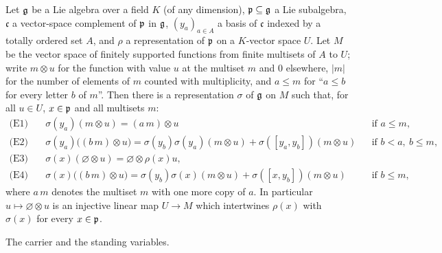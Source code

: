 \begin{theorem}\label{l02:thm:relrep}
Let $\mathfrak{g}$ be a Lie algebra over a field $K$ (of any dimension), $\mathfrak{p}\subseteq\mathfrak{g}$ a Lie subalgebra,
$\mathfrak c$ a vector-space complement of $\mathfrak{p}$ in $\mathfrak{g}$, $(y_a)_{a\in A}$ a basis of $\mathfrak c$ indexed by
a totally ordered set $A$, and $\rho$ a representation of $\mathfrak{p}$ on a $K$-vector space $U$. Let $M$ be the
vector space of finitely supported functions from finite multisets of $A$ to $U$; write $m\otimes u$ for
the function with value $u$ at the multiset $m$ and $0$ elsewhere, $|m|$ for the number of elements of
$m$ counted with multiplicity, and $a\le m$ for ``$a\le b$ for every letter $b$ of $m$''. Then there is a
representation $\sigma$ of $\mathfrak{g}$ on $M$ such that, for all $u\in U$, $x\in\mathfrak{p}$ and all multisets $m$:
\begin{align*}
 \text{(E1)}\quad& \sigma(y_a)(m\otimes u) = (a\,m)\otimes u &&\text{if } a\le m,\\
 \text{(E2)}\quad& \sigma(y_a)\bigl((b\,m)\otimes u\bigr) = \sigma(y_b)\sigma(y_a)(m\otimes u) + \sigma([y_a,y_b])(m\otimes u)
   &&\text{if } b<a,\ b\le m,\\
 \text{(E3)}\quad& \sigma(x)(\varnothing\otimes u) = \varnothing\otimes\rho(x)u,\\
 \text{(E4)}\quad& \sigma(x)\bigl((b\,m)\otimes u\bigr) = \sigma(y_b)\sigma(x)(m\otimes u) + \sigma([x,y_b])(m\otimes u)
   &&\text{if } b\le m,
\end{align*}
where $a\,m$ denotes the multiset $m$ with one more copy of $a$. In particular $u\mapsto\varnothing\otimes u$ is
an injective linear map $U\to M$ which intertwines $\rho(x)$ with $\sigma(x)$ for every $x\in\mathfrak{p}$.
\end{theorem}

The carrier and the standing variables.

